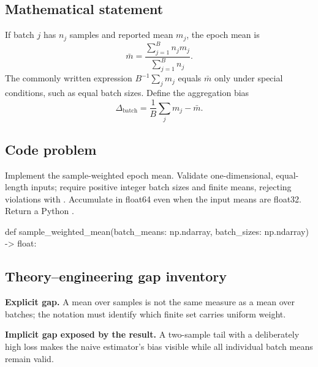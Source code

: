 
        \subsection{Mathematical statement}


If batch $j$ has $n_j$ samples and reported mean $m_j$, the epoch mean is
\[
  \bar m=\frac{\sum_{j=1}^{B}n_jm_j}{\sum_{j=1}^{B}n_j}.
\]
The commonly written expression $B^{-1}\sum_jm_j$ equals $\bar m$ only under
special conditions, such as equal batch sizes.  Define the aggregation bias
\[
  \Delta_{\mathrm{batch}}=\frac1B\sum_jm_j-\bar m.
\]


        \subsection{Code problem}


Implement the sample-weighted epoch mean.  Validate one-dimensional, equal-length
inputs; require positive integer batch sizes and finite means, rejecting
violations with .  Accumulate in
float64 even when the input means are float32.  Return a Python .


        \begin{contractbox}
        \begin{Code}
        def sample_weighted_mean(batch_means: np.ndarray, batch_sizes: np.ndarray) -> float:
        \end{Code}
        \end{contractbox}

        \subsection{Theory--engineering gap inventory}

        \begin{gapbox}
        \textbf{Explicit gap.} A mean over samples is not the same measure as a mean over batches; the notation must identify which finite set carries uniform weight.

        \textbf{Implicit gap exposed by the result.} A two-sample tail with a deliberately high loss makes the naive estimator's bias visible while all individual batch means remain valid.
        \end{gapbox}

